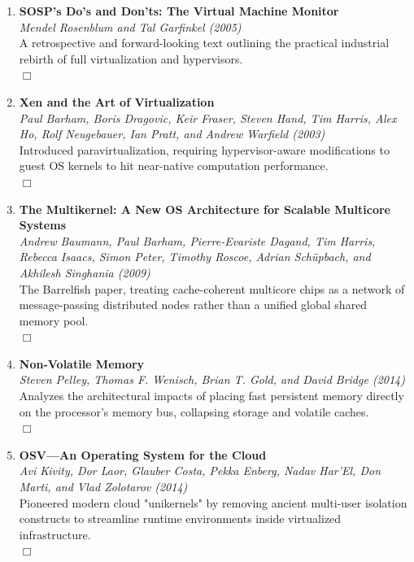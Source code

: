 \documentclass[11pt,a4paper]{article}
\begin{document}
\begin{enumerate}[resume]
    \item \textbf{SOSP's Do's and Don'ts: The Virtual Machine Monitor} \\
    \textit{Mendel Rosenblum and Tal Garfinkel (2005)} \\
    A retrospective and forward-looking text outlining the practical industrial rebirth of full virtualization and hypervisors. \\
    $\Box$
    
    \item \textbf{Xen and the Art of Virtualization} \\
    \textit{Paul Barham, Boris Dragovic, Keir Fraser, Steven Hand, Tim Harris, Alex Ho, Rolf Neugebauer, Ian Pratt, and Andrew Warfield (2003)} \\
    Introduced paravirtualization, requiring hypervisor-aware modifications to guest OS kernels to hit near-native computation performance. \\
    $\Box$
    
    \item \textbf{The Multikernel: A New OS Architecture for Scalable Multicore Systems} \\
    \textit{Andrew Baumann, Paul Barham, Pierre-Evariste Dagand, Tim Harris, Rebecca Isaacs, Simon Peter, Timothy Roscoe, Adrian Sch\"{u}pbach, and Akhilesh Singhania (2009)} \\
    The Barrelfish paper, treating cache-coherent multicore chips as a network of message-passing distributed nodes rather than a unified global shared memory pool. \\
    $\Box$
    
    \item \textbf{Non-Volatile Memory} \\
    \textit{Steven Pelley, Thomas F. Wenisch, Brian T. Gold, and David Bridge (2014)} \\
    Analyzes the architectural impacts of placing fast persistent memory directly on the processor's memory bus, collapsing storage and volatile caches. \\
    $\Box$
    
    \item \textbf{OSV---An Operating System for the Cloud} \\
    \textit{Avi Kivity, Dor Laor, Glauber Costa, Pekka Enberg, Nadav Har'El, Don Marti, and Vlad Zolotarov (2014)} \\
    Pioneered modern cloud "unikernels" by removing ancient multi-user isolation constructs to streamline runtime environments inside virtualized infrastructure. \\
    $\Box$
    

\end{enumerate}
\end{document}
